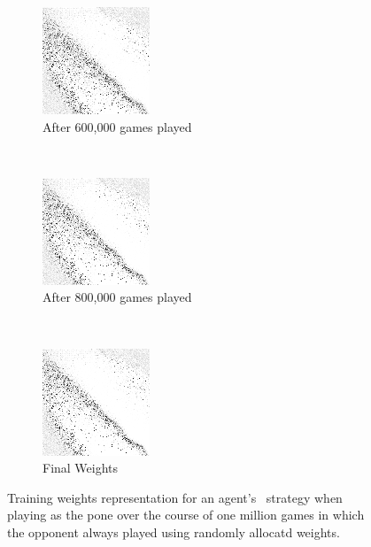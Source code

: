 \begin{figure}
	\begin{subfigure}[t]{0.2\textwidth}
	\includegraphics[width=\stratgraphwidth]{images/findings/round2/flipbook/random/checkpoint_600000.png}
	\caption{After 600,000 games played}
	\end{subfigure}
	~
	\begin{subfigure}[t]{0.2\textwidth}
	\includegraphics[width=\stratgraphwidth]{images/findings/round2/flipbook/random/checkpoint_800000.png}
	\caption{After 800,000 games played}
	\end{subfigure}
	~
	\begin{subfigure}[t]{0.2\textwidth}
	\includegraphics[width=\stratgraphwidth]{images/findings/round2/flipbook/random/checkpoint_999999.png}
	\caption{Final Weights}
	\end{subfigure}

\caption{
	Training weights representation for an agent's \handmaxavg\ strategy
	when playing as the pone
	over the course of one million games
	in which the opponent always played using randomly allocatd weights.
}
\label{fig:r2-flip-random}
\end{figure}
